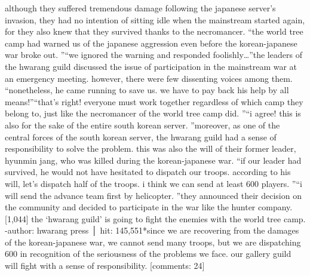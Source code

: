 although they suffered tremendous damage following the japanese server’s invasion, they had no intention of sitting idle when the mainstream started again, for they also knew that they survived thanks to the necromancer.
“the world tree camp had warned us of the japanese aggression even before the korean-japanese war broke out.
”“we ignored the warning and responded foolishly…”the leaders of the hwarang guild discussed the issue of participation in the mainstream war at an emergency meeting.
 however, there were few dissenting voices among them.
“nonetheless, he came running to save us.
 we have to pay back his help by all means!”“that’s right! everyone must work together regardless of which camp they belong to, just like the necromancer of the world tree camp did.
”“i agree! this is also for the sake of the entire south korean server.
”moreover, as one of the central forces of the south korean server, the hwarang guild had a sense of responsibility to solve the problem.
 this was also the will of their former leader, hyunmin jang, who was killed during the korean-japanese war.
“if our leader had survived, he would not have hesitated to dispatch our troops.
 according to his will, let’s dispatch half of the troops.
 i think we can send at least 600 players.
”“i will send the advance team first by helicopter.
”they announced their decision on the community and decided to participate in the war like the hunter company.
[1,044] the ‘hwarang guild’ is going to fight the enemies with the world tree camp.
-author: hwarang press │ hit: 145,551*since we are recovering from the damages of the korean-japanese war, we cannot send many troops, but we are dispatching 600 in recognition of the seriousness of the problems we face.
 our gallery guild will fight with a sense of responsibility.
[comments: 24]

 